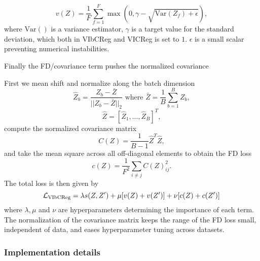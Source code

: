 \documentclass[../../thesis.tex]{subfiles}
\begin{document}
\begin{equation}
    v(Z) =  \frac{1}{F} \sum_{f=1}^F \max(0,\gamma - \sqrt{\text{Var}(Z_f)+\epsilon}),
\end{equation}
where $\text{Var}()$ is a variance estimator, $\gamma$ is a target value for the standard deviation, which both in VIbCReg and VICReg is set to $1$. $\epsilon$ is a small scalar preventing numerical instabilities.  \newline 

Finally the FD/covariance term pushes the normalized covariance 

First we mean shift and normalize along the batch dimension
\begin{equation}
    \widehat{Z}_b = \frac{Z_b-\bar{Z}}{||Z_b-\bar{Z}||_2} \text{ where }  \bar{Z} = \frac{1}{B}\sum_{b=1}^B  Z_b,
\end{equation}
\begin{equation}
    \widehat{Z} = [\widehat{Z}_1,...,\widehat{Z}_B]^T,
\end{equation}
compute the normalized covariance matrix
\begin{equation}
    C(Z) = \frac{1}{B-1}\widehat{Z}^T \widehat{Z},
\end{equation}
and take the mean square across all off-diagonal elements to obtain the FD loss
\begin{equation}
    c(Z) = \frac{1}{F^2}\sum_{i\neq j} C(Z)_{ij}^2.
\end{equation}
The total loss is then given by
\begin{equation}
    \mathcal{L}_\text{VIbCReg} = \lambda s(Z,Z') + \mu [v(Z) + v(Z')] + \nu[c(Z)+c(Z')]
\end{equation}
where $\lambda, \mu$ and $\nu$ are hyperparameters determining the importance of each term. The normalization of the covariance matrix keeps the range of the FD loss small, independent of data, and eases hyperparameter tuning across datasets.

\subsubsection{Implementation details}
\end{document}
